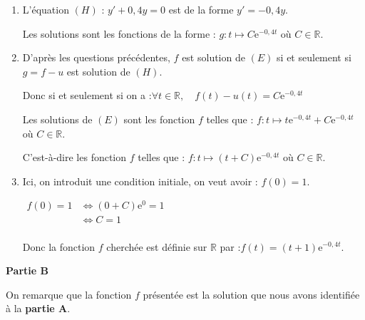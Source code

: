\documentclass[10pt]{article}
\providecommand{\R}{\mathbb{R}}
\providecommand{\e}{{\mathrm{e}}}
\begin{document}
\begin{enumerate}
\begin{enumerate}
Donc $f$ est solution de $(E)$.

\item L'équation $(H)$ : $y' + 0,4y = 0$ est de la forme $y' = - 0,4y$.

Les solutions sont les fonctions de la forme : $g : t \longmapsto C\e^{-0,4t}$ où $C \in \R$.

\item D'après les questions précédentes, $f$ est solution de $(E)$ si et seulement si \linebreak $g = f - u$ est solution de $(H)$.

	Donc si et seulement si on a :\quad  $\forall t \in \R, \quad f(t) - u(t) = C\e^{-0,4t}$

Les solutions de $(E)$ sont les fonction $f$ telles que : $f : t \longmapsto t\e^{-0,4t} + C\e^{-0,4t}$ où $C \in \R$.

C'est-à-dire les fonction $f$ telles que : $f : t \longmapsto (t + C)\e^{-0,4t}$ où $C \in \R$.

\item Ici, on introduit une condition initiale, on veut avoir : \quad $f(0) = 1$.

$\begin{aligned}
f(0) = 1 & \iff (0 + C)\e^{0} = 1\\
	&\iff C = 1\\
\end{aligned}$

Donc la fonction $f$ cherchée est définie sur $\R$ par :\quad $f(t) = (t + 1)\e^{-0,4t}$.
	\end{enumerate}
\end{enumerate}

\bigskip

\textbf{Partie B}

\medskip

On remarque que la fonction $f$ présentée est la solution que nous avons identifiée à la \textbf{partie A}.
\end{document}
